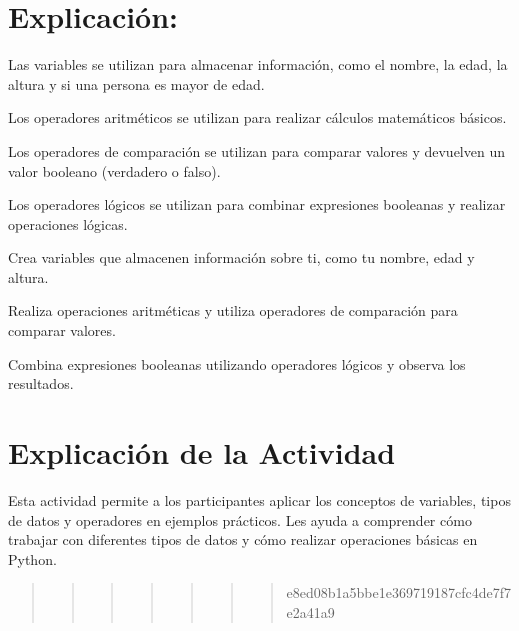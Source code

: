 \documentclass[
  a4paper,
  onepage,
  openany]{scrreprt}
\begin{document}
\hypertarget{explicaciuxf3n-5}{%
\section{Explicación:}\label{explicaciuxf3n-5}}

Las variables se utilizan para almacenar información, como el nombre, la
edad, la altura y si una persona es mayor de edad.

Los operadores aritméticos se utilizan para realizar cálculos
matemáticos básicos.

Los operadores de comparación se utilizan para comparar valores y
devuelven un valor booleano (verdadero o falso).

Los operadores lógicos se utilizan para combinar expresiones booleanas y
realizar operaciones lógicas.

\begin{tcolorbox}[enhanced jigsaw, breakable, opacityback=0, toptitle=1mm, coltitle=black, toprule=.15mm, rightrule=.15mm, colframe=quarto-callout-important-color-frame, opacitybacktitle=0.6, arc=.35mm, title=\textcolor{quarto-callout-important-color}{\faExclamation}\hspace{0.5em}{Actividad Práctica:}, titlerule=0mm, colbacktitle=quarto-callout-important-color!10!white, bottomtitle=1mm, bottomrule=.15mm, colback=white, left=2mm, leftrule=.75mm]

Crea variables que almacenen información sobre ti, como tu nombre, edad
y altura.

Realiza operaciones aritméticas y utiliza operadores de comparación para
comparar valores.

Combina expresiones booleanas utilizando operadores lógicos y observa
los resultados.

\end{tcolorbox}

\hypertarget{explicaciuxf3n-de-la-actividad-5}{%
\section{Explicación de la
Actividad}\label{explicaciuxf3n-de-la-actividad-5}}

Esta actividad permite a los participantes aplicar los conceptos de
variables, tipos de datos y operadores en ejemplos prácticos. Les ayuda
a comprender cómo trabajar con diferentes tipos de datos y cómo realizar
operaciones básicas en Python.

\begin{quote}
\begin{quote}
\begin{quote}
\begin{quote}
\begin{quote}
\begin{quote}
\begin{quote}
e8ed08b1a5bbe1e369719187cfc4de7f7e2a41a9
\end{quote}
\end{quote}
\end{quote}
\end{quote}
\end{quote}
\end{quote}
\end{quote}
\end{document}
